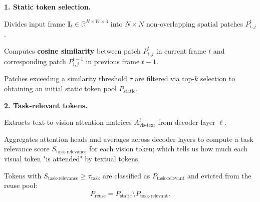 \begin{dashlist}
    \item \textbf{1. Static token selection.}
    \begin{dashlist}
        \item Divides input frame $\mathbf{I}_t \in \mathbb{R}^{H \times W \times 3}$ into $N \times N$ non-overlapping spatial patches $P_{i,j}^t$.
        \item Computes \textbf{cosine similarity} between patch $P_{i,j}^t$ in current frame $t$ and corresponding patch $P_{i,j}^{t-1}$ in previous frame $t-1$.
        \item Patches exceeding a similarity threshold $\tau$ are filtered via top-$k$ selection to obtaining an initial static token pool $P_{\text{static}}$.
    \end{dashlist}

    \item \textbf{2. Task-relevant tokens.}
    \begin{dashlist}
        \item Extracts text-to-vision attention matrices $A_{\text{vis-text}}^{\ell}$ from decoder layer $\ell$.
        \item Aggregates attention heads and averages across decoder layers to compute a task relevance score $S_{\text{task-relevance}}$ for each vision token; which tells us how much each visual token "is attended" by textual tokens.
        \item Tokens with $S_{\text{task-relevance}} \ge \tau_{\text{task}}$ are classified as $P_{\text{task-relevant}}$ and evicted from the reuse pool:
        \[
        P_{\text{reuse}} = P_{\text{static}} \setminus P_{\text{task-relevant}} .
        \]
    \end{dashlist}


\end{dashlist}

